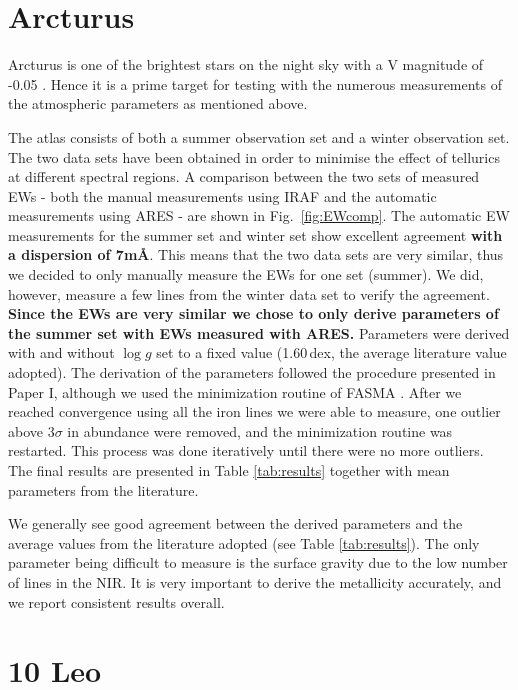 \section{Arcturus}
\label{sec:arcturus}

Arcturus is one of the brightest stars on the night sky with a V magnitude of
-0.05 \citep{Ducati2002}. Hence it is a prime target for testing with the
numerous measurements of the atmospheric parameters as mentioned above.

The atlas consists of both a summer observation set and a winter observation
set. The two data sets have been obtained in order to minimise the effect of
tellurics at different spectral regions. A comparison between the two sets of
measured EWs - both the manual measurements using IRAF and the automatic
measurements using ARES - are shown in Fig.~\ref{fig:EWcomp}. The automatic EW
measurements for the summer set and winter set show excellent agreement {\bf
with a dispersion of 7m\AA{}}. This means that the two data sets are very
similar, thus we decided to only manually measure the EWs for one set (summer).
We did, however, measure a few lines from the winter data set to verify the
agreement. {\bf Since the EWs are very similar we chose to only derive
parameters of the summer set with EWs measured with ARES.} Parameters were
derived with and without $\log g$ set to a fixed value (1.60\,dex, the average
literature value adopted). The derivation of the parameters followed the
procedure presented in Paper I, although we used the minimization routine of
FASMA \citep{Andreasen2017a}. After we reached convergence using all the iron
lines we were able to measure, one outlier above $3\sigma$ in abundance were
removed, and the minimization routine was restarted. This process was done
iteratively until there were no more outliers. The final results are presented
in Table \ref{tab:results} together with mean parameters from the literature.

We generally see good agreement between the derived parameters and the average
values from the literature adopted (see Table \ref{tab:results}). The only
parameter being difficult to measure is the surface gravity due to the low
number of  lines in the NIR. It is very important to derive the
metallicity accurately, and we report consistent results overall.


\section{10 Leo}
\label{sec:10Leo}

